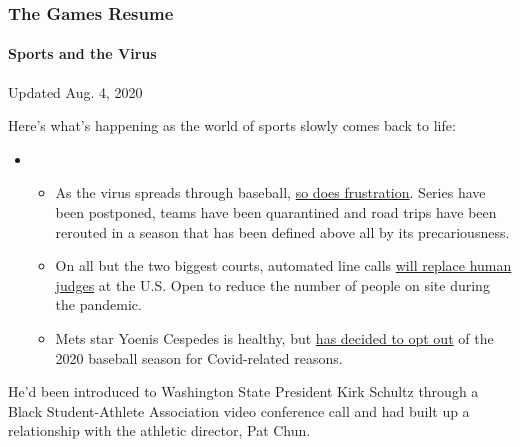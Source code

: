 \hypertarget{the-games-resume}{%
\subsubsection{The Games Resume}\label{the-games-resume}}

\hypertarget{sports-and-the-virus}{%
\paragraph{Sports and the Virus}\label{sports-and-the-virus}}

Updated Aug. 4, 2020

Here's what's happening as the world of sports slowly comes back to
life:

\begin{itemize}
\item
  \begin{itemize}
  \tightlist
  \item
    As the virus spreads through baseball,
    \href{https://www.nytimes3xbfgragh.onion/2020/08/03/sports/baseball/mlb-coronavirus-outbreak.html?action=click\&pgtype=Article\&state=default\&region=MAIN_CONTENT_2\&context=storylines_keepup}{so
    does frustration}. Series have been postponed, teams have been
    quarantined and road trips have been rerouted in a season that has
    been defined above all by its precariousness.
  \item
    On all but the two biggest courts, automated line calls
    \href{https://www.nytimes3xbfgragh.onion/2020/08/03/sports/tennis/us-open-hawkeye-line-judges.html?action=click\&pgtype=Article\&state=default\&region=MAIN_CONTENT_2\&context=storylines_keepup}{will
    replace human judges} at the U.S. Open to reduce the number of
    people on site during the pandemic.
  \item
    Mets star Yoenis Cespedes is healthy, but
    \href{https://www.nytimes3xbfgragh.onion/2020/08/02/sports/baseball/Yoenis-cespedes-opt-out-rule.html?action=click\&pgtype=Article\&state=default\&region=MAIN_CONTENT_2\&context=storylines_keepup}{has
    decided to opt out} of the 2020 baseball season for Covid-related
    reasons.
  \end{itemize}
\end{itemize}

He'd been introduced to Washington State President Kirk Schultz through
a Black Student-Athlete Association video conference call and had built
up a relationship with the athletic director, Pat Chun.

